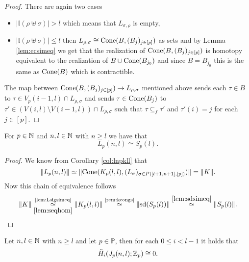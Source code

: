 \begin{proof}
  There are again two cases
  \begin{itemize}
    \item $\left|\mathbb{I}(\rho \uplus \sigma)\right| > l$ which means that $L_{\sigma,\rho}$ is empty,
    \item $\left|\mathbb{I}(\rho \uplus \sigma)\right| \leq l$ then $L_{\rho, \sigma} \cong {\rm Cone}(B, (B_j)_{j\in [p]})$ as sets and by Lemma \ref{lem:ecsimeq} we get that the realization of ${\rm Cone}(B, (B_j)_{j \in [p]})$ is homotopy equivalent to the realization of $B \cup {\rm Cone}(B_{j_0})$ and since $B = B_{j_0}$ this is the same as ${\rm Cone}(B)$ which is contractible.
    \end{itemize}
    The map between ${\rm Cone}(B, (B_j)_{j\in [p]}) \to L_{\rho, \sigma}$ mentioned above sends each $\tau \in B$ to $\tau \in V_p(i-1, l) \cap L_{\rho, \sigma}$ and sends $\tau \in {\rm Cone}(B_j)$ to $\tau' \in (V(i,l) \setminus V(i-1,l))\cap L_{\rho,\sigma}$ such that $\tau \subseteq_f \tau'$ and $\tau'(i) = j$ for each $j \in [p]$.
\end{proof}

\begin{col}\label{col:lspl}
  For $p \in \mathbb{N}$ and $n,l\in \mathbb{N}$ with $n \geq l$ we have that \[L_p(n,l) \simeq S_p(l).\]
\end{col}

\begin{proof}
  We know from Corollary \ref{col:lnpkll} that \[\lVert L_p(n,l) \rVert \simeq \lVert{\rm Cone}(K_p(l,l), (L_\sigma)_{\sigma\in P([l+1,n+1],[p])})\rVert = \lVert K \rVert.\] Now this chain of equivalence follows
  \begin{equation*}
    \lVert K \rVert \underset{\ref{lem:seqhom}}{\overset{\text{\ref{lem:Lsigsimeq}}}{\simeq}} \lVert K_p(l,l) \rVert \overset{\text{\ref{rem:kcongs}}}{\simeq} \lVert {\rm sd}(S_p(l)) \rVert \overset{\ref{lem:sdsimeq}}{\simeq} \lVert S_p(l) \rVert.
  \end{equation*}
\end{proof}

\begin{lemma}\label{lem:jc0}
  Let $n,l \in \mathbb{N}$ with $n \geq l$ and let $p \in \mathbb{P}$, then for each $0 \leq i < l-1$ it holds that
  \begin{equation*}
    \tilde{H}_i(J_p(n,l); \mathbb{Z}_p) \cong 0.
  \end{equation*}
\end{lemma}

